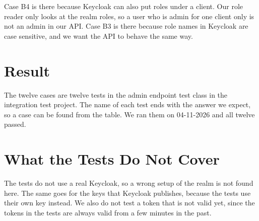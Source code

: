 \documentclass[a4paper,11pt]{article}
\begin{document}
Case B4 is there because Keycloak can also put roles under a client. Our role reader only looks at the realm roles, so a user who is admin for one client only is not an admin in our API. Case B3 is there because role names in Keycloak are case sensitive, and we want the API to behave the same way.

\section{Result}
The twelve cases are twelve tests in the admin endpoint test class in the integration test project. The name of each test ends with the answer we expect, so a case can be found from the table. We ran them on 04-11-2026 and all twelve passed.

\section{What the Tests Do Not Cover}
The tests do not use a real Keycloak, so a wrong setup of the realm is not found here. The same goes for the keys that Keycloak publishes, because the tests use their own key instead. We also do not test a token that is not valid yet, since the tokens in the tests are always valid from a few minutes in the past.
\end{document}
